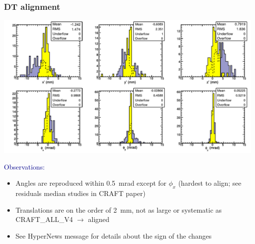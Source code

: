 \documentclass[compress]{beamer}
\begin{document}
\begin{frame}
\frametitle{DT alignment}
\begin{center}
\includegraphics[width=0.8\linewidth]{v4_2008_2009.pdf}
\end{center}
\textcolor{darkblue}{\large Observations:}

\begin{itemize}
\item Angles are reproduced within 0.5~mrad except for $\phi_x$
  (hardest to align; see residuals median studies in CRAFT paper)
\item Translations are on the order of 2~mm, not as large or
  systematic as CRAFT\_ALL\_V4 $\to$ aligned
\item See HyperNews message for details about the sign of the changes
\end{itemize}
\end{frame}
\end{document}
